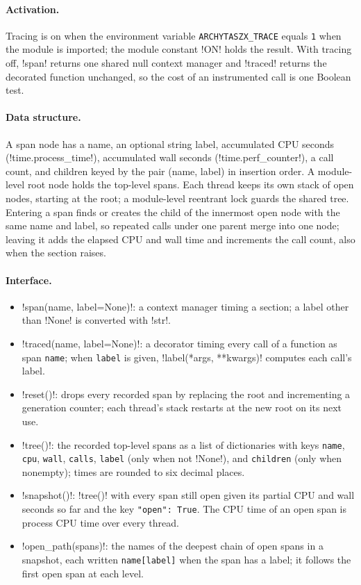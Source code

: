 \paragraph{Activation.} Tracing is on when the environment variable \texttt{ARCHYTASZX\_TRACE} equals \texttt{1} when the module is imported; the module constant \py!ON! holds the result. With tracing off, \py!span! returns one shared null context manager and \py!traced! returns the decorated function unchanged, so the cost of an instrumented call is one Boolean test.

\paragraph{Data structure.} A span node has a name, an optional string label, accumulated CPU seconds (\py!time.process_time!), accumulated wall seconds (\py!time.perf_counter!), a call count, and children keyed by the pair (name, label) in insertion order. A module-level root node holds the top-level spans. Each thread keeps its own stack of open nodes, starting at the root; a module-level reentrant lock guards the shared tree. Entering a span finds or creates the child of the innermost open node with the same name and label, so repeated calls under one parent merge into one node; leaving it adds the elapsed CPU and wall time and increments the call count, also when the section raises.

\paragraph{Interface.}
\begin{itemize}
\item \py!span(name, label=None)!: a context manager timing a section; a label other than \py!None! is converted with \py!str!.
\item \py!traced(name, label=None)!: a decorator timing every call of a function as span \texttt{name}; when \texttt{label} is given, \py!label(*args, **kwargs)! computes each call's label.
\item \py!reset()!: drops every recorded span by replacing the root and incrementing a generation counter; each thread's stack restarts at the new root on its next use.
\item \py!tree()!: the recorded top-level spans as a list of dictionaries with keys \texttt{name}, \texttt{cpu}, \texttt{wall}, \texttt{calls}, \texttt{label} (only when not \py!None!), and \texttt{children} (only when nonempty); times are rounded to six decimal places.
\item \py!snapshot()!: \py!tree()! with every span still open given its partial CPU and wall seconds so far and the key \texttt{"open": True}. The CPU time of an open span is process CPU time over every thread.
\item \py!open_path(spans)!: the names of the deepest chain of open spans in a snapshot, each written \texttt{name[label]} when the span has a label; it follows the first open span at each level.
\end{itemize}

